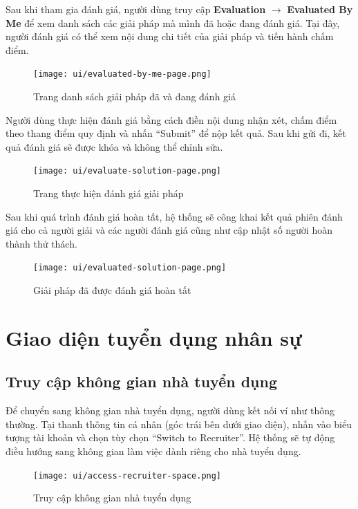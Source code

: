 Sau khi tham gia đánh giá, người dùng truy cập \textbf{Evaluation} $\rightarrow$ \textbf{Evaluated By Me} để xem danh sách các giải pháp mà mình đã hoặc đang đánh giá.  
Tại đây, người đánh giá có thể xem nội dung chi tiết của giải pháp và tiến hành chấm điểm.

\begin{figure}[H]
  \centering
  \texttt{[image: ui/evaluated-by-me-page.png]}
  \caption{Trang danh sách giải pháp đã và đang đánh giá}
  \label{fig:evaluated-by-me-page}
\end{figure}

Người dùng thực hiện đánh giá bằng cách điền nội dung nhận xét, chấm điểm theo thang điểm quy định và nhấn ``Submit'' để nộp kết quả.  
Sau khi gửi đi, kết quả đánh giá sẽ được khóa và không thể chỉnh sửa.

\begin{figure}[H]
  \centering
  \texttt{[image: ui/evaluate-solution-page.png]}
  \caption{Trang thực hiện đánh giá giải pháp}
  \label{fig:evaluate-solution-page}
\end{figure}

Sau khi quá trình đánh giá hoàn tất, hệ thống sẽ công khai kết quả phiên đánh giá cho cả người giải và các người đánh giá cũng như cập nhật số người hoàn thành thử thách. 

\begin{figure}[H]
  \centering
  \texttt{[image: ui/evaluated-solution-page.png]}
  \caption{Giải pháp đã được đánh giá hoàn tất}
  \label{fig:evaluated-solution-page}
\end{figure}

\section{Giao diện tuyển dụng nhân sự}

\subsection{Truy cập không gian nhà tuyển dụng}

Để chuyển sang không gian nhà tuyển dụng, người dùng kết nối ví như thông thường.  
Tại thanh thông tin cá nhân (góc trái bên dưới giao diện), nhấn vào biểu tượng tài khoản và chọn tùy chọn ``Switch to Recruiter''.  
Hệ thống sẽ tự động điều hướng sang không gian làm việc dành riêng cho nhà tuyển dụng.

\begin{figure}[H]
  \centering
  \texttt{[image: ui/access-recruiter-space.png]}
  \caption{Truy cập không gian nhà tuyển dụng}
  \label{fig:access-recruiter-space}
\end{figure}

